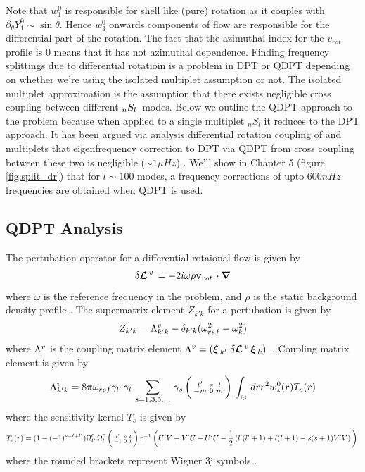 Note that $w_1^0$ is responsible for shell like (pure) rotation as it couples with $\partial_{\theta} Y_1^0 \sim \sin\theta$. Hence $w_3^0$ onwards components of flow are responsible for the differential part of the rotation. The fact that the azimuthal index for the $v_{rot}$ profile is $0$ means that it has not azimuthal dependence. Finding frequency splittings due to differential rotatioin is a problem in DPT or QDPT depending on whether we're using the isolated multiplet assumption or not. The isolated multiplet approximation is the assumption that there exists negligible cross coupling between different $_{n}S_{l}\,$ modes. 
Below we outline the QDPT approach to the problem because when applied to a single multiplet $_n S_l$ it reduces to the DPT approach. It has been argued via analysis differential rotation coupling of  and  multiplets that eigenfrequency correction to DPT via QDPT from cross coupling between these two is negligible ($\sim 1 \mu Hz$) \cite{lavely92}. We'll show in Chapter 5 (figure \ref{fig:split_dr}) that for $l\sim 100$ modes, a frequency corrections of upto $600 nHz$ frequencies are obtained when QDPT is used.


\subsection{QDPT Analysis}
The pertubation operator \dLd for a differential rotaional flow is given by 
\begin{equation}
\delta \bm{\mathcal{L}}\,^{v}\, = -2i \omega \rho \mathbf{v}_{rot}\, \cdot \bm{\nabla}
\end{equation}
where $\omega$ is the reference frequency in the problem, and $\rho$ is the static background density profile \cite{ritzwoller}.
The supermatrix element $Z_{k' k}$ for a pertubation \dLd is given by
\begin{equation}
Z_{k' k} = \Lambda^{v}_{k'k} - \delta_{k'k} (\omega_{ref}^2 - \omega_k^2)
\end{equation}
where $\Lambda^{v}$ is the coupling matrix element $\Lambda^{v} = (\bm{\xi}\,_{k'}|\delta \bm{\mathcal{L}}\,^{v}\, \bm{\xi}\,_{k})\,$ .
Coupling matrix element is given by
\begin{equation}
\Lambda^{v}_{k'k} = 8 \pi \omega_{ref} \gamma_{l'}\,\gamma_{l}\, \sum_{s=1,3,5,...}\, \gamma_{s}\, \bigg(\begin{smallmatrix} l' & s & l \\ -m & 0 & m \end{smallmatrix}\bigg)\, \int_{\odot} \, dr 
r^2 w_s^0(r) T_s(r)
\end{equation}
where the sensitivity kernel $T_s$ is given by
\begin{dmath}
T_s(r) = (1-(-1)^{s+l+l'}) \om{l'}{0} \om{l}{0} \wigred{-1}{0}{1} r^{-1}
 \enc{U'V+V'U-U'U-\frac{1}{2}\enc{l'(l'+1) + l(l+1) - s(s+1) V'V}}
\end{dmath}
where the rounded brackets represent Wigner 3j symbols \cite{ritzwoller}. 
